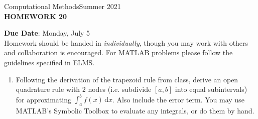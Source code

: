 \documentclass[12pt]{article}
\begin{document}
\begin{center}
Computational Methods\qquad Summer 2021
\\

\textbf{\large HOMEWORK 20}\\
\end{center}
\noindent \textbf{Due Date}: Monday, July 5\\

\noindent Homework should be handed in \emph{individually}, though you may work with others and collaboration is encouraged. For MATLAB problems please follow the guidelines specified in ELMS.

\begin{enumerate}
\item Following the derivation of the trapezoid rule from class, derive an open quadrature rule with 2 nodes (i.e. subdivide $[a,b]$ into equal subintervals) for approximating $\displaystyle{\int_a^b\!f(x)\,\mathrm{d}x}$. Also include the error term. You may use MATLAB's Symbolic Toolbox to evaluate any integrals, or do them by hand.
\end{enumerate}
\end{document}
